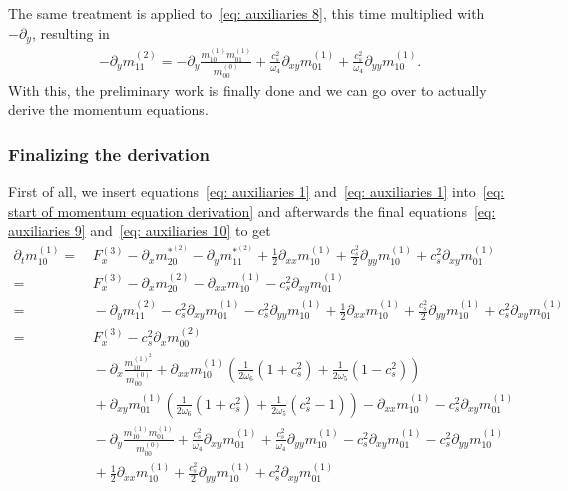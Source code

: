 The same treatment is applied to~\eqref{eq: auxiliaries 8}, this time multiplied with $-\partial_y$, resulting in
\begin{align}
  \label{eq: auxiliaries 10}
  -\partial_y m_{11}^{(2)}
  =
  -\partial_y \frac{ m_{10}^{(1)}m_{01}^{(1)}}{m_{00}^{(0)}}
  + \frac{c_s^2}{\omega_4}\partial_{xy} m_{01}^{(1)}
  + \frac{c_s^2}{\omega_4}\partial_{yy} m_{10}^{(1)}
  .
\end{align}
With this, the preliminary work is finally done and we can go over to actually derive the momentum equations.

\subsubsection{Finalizing the derivation}
\label{subs:Finalizing the derivation}
First of all, we insert equations~\eqref{eq: auxiliaries 1} and~\eqref{eq: auxiliaries 1} into~\eqref{eq: start of momentum equation derivation}
and afterwards the final equations~\eqref{eq: auxiliaries 9} and~\eqref{eq: auxiliaries 10} to get
\begin{align}
  \nonumber
  \partial_t m_{10}^{(1)} =&\,
  F_x^{(3)}
  - \partial_x m_{20}^{*^{(2)}}
  - \partial_y m_{11}^{*^{(2)}}
  + \frac{1}{2}\partial_{xx} m_{10}^{(1)}
  + \frac{c_s^2}{2} \partial_{yy} m_{10}^{(1)} + c_s^2\partial_{xy} m_{01}^{(1)}
  \\\nonumber =&\,
  F_x^{(3)}
  - \partial_x m_{20}^{(2)}
  - \partial_{xx} m_{10}^{(1)}
  - c_s^2\partial_{xy} m_{01}^{(1)}
  \\\nonumber =&\,
  - \partial_y m_{11}^{(2)}
  - c_s^2 \partial_{xy} m_{01}^{(1)}
  - c_s^2 \partial_{yy} m_{10}^{(1)}
  + \frac{1}{2}\partial_{xx} m_{10}^{(1)}
  + \frac{c_s^2}{2} \partial_{yy} m_{10}^{(1)} + c_s^2\partial_{xy} m_{01}^{(1)}
  \\\nonumber =&\,
  F_x^{(3)}
  - c_s^2 \partial_x  m_{00}^{(2)}
  \\\nonumber &\,
  - \partial_x\frac{ m_{10}^{{(1)}^2} }{m_{00}^{(0)}}
  + \partial_{xx} m_{10}^{(1)} \left(\frac{1}{2\omega_6}(1+c_s^2)
  + \frac{1}{2\omega_5} (1 - c_s^2)\right)
  \\\nonumber &\,
  + \partial_{xy} m_{01}^{(1)} \left(\frac{1}{2\omega_6}(1+c_s^2)
  + \frac{1}{2\omega_5} (c_s^2 - 1)\right)
  - \partial_{xx} m_{10}^{(1)}
  - c_s^2\partial_{xy} m_{01}^{(1)}
  \\\nonumber &\,
  -\partial_y \frac{ m_{10}^{(1)}m_{01}^{(1)}}{m_{00}^{(0)}}
  + \frac{c_s^2}{\omega_4}\partial_{xy} m_{01}^{(1)}
  + \frac{c_s^2}{\omega_4}\partial_{yy} m_{10}^{(1)}
  - c_s^2 \partial_{xy} m_{01}^{(1)}
  - c_s^2 \partial_{yy} m_{10}^{(1)}
  \\\nonumber &\,
  + \frac{1}{2}\partial_{xx} m_{10}^{(1)}
  + \frac{c_s^2}{2} \partial_{yy} m_{10}^{(1)} + c_s^2\partial_{xy} m_{01}^{(1)}
\end{align}
